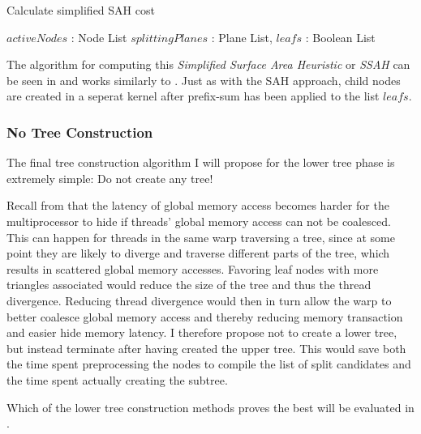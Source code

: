 \begin{algorithm}
  \caption{Calculate simplified SAH cost}
  \label{alg:calcBalancedCost}
  \begin{algorithmic}
              {$activeNodes$ : Node List}
              {$splittingPlanes$ : Plane List, $leafs$ : Boolean List}{
                  \ENDFOR
                \ENDFOR
              }
  \end{algorithmic}
\end{algorithm}


The algorithm for computing this \textit{Simplified Surface Area Heuristic} or
\textit{SSAH} can be seen in  and works similarly
to . Just as with the SAH approach, child nodes are
created in a seperat kernel after prefix-sum has been applied to the list
$leafs$.

\subsubsection{No Tree Construction}

The final tree construction algorithm I will propose for the lower tree phase is
extremely simple: Do not create any tree!

Recall from  that the latency of global memory
access becomes harder for the multiprocessor to hide if threads' global memory
access can not be coalesced. This can happen for threads in the same warp
traversing a tree, since at some point they are likely to diverge and traverse
different parts of the tree, which results in scattered global memory
accesses. Favoring leaf nodes with more triangles associated would reduce the
size of the tree and thus the thread divergence. Reducing thread divergence
would then in turn allow the warp to better coalesce global memory access and
thereby reducing memory transaction and easier hide memory latency. I therefore
propose not to create a lower tree, but instead terminate after having created
the upper tree. This would save both the time spent preprocessing the nodes to
compile the list of split candidates and the time spent actually creating the
subtree.

Which of the lower tree construction methods proves the best will be evaluated
in .
